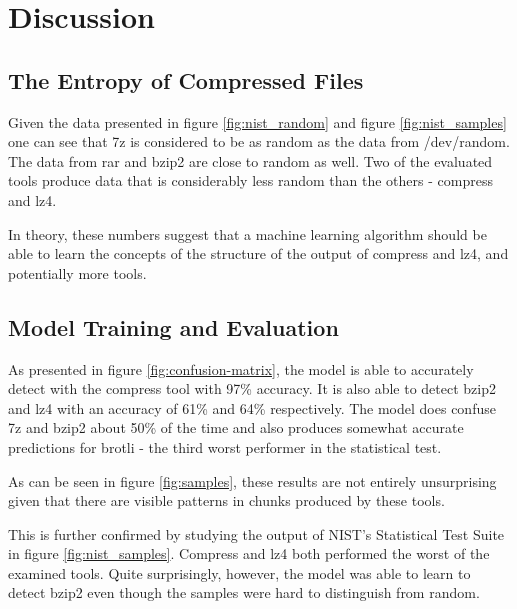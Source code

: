 \documentclass[conference]{IEEEtran}
\begin{document}
\section{Discussion}

\subsection{The Entropy of Compressed Files}

Given the data presented in figure \ref{fig:nist_random} and figure \ref{fig:nist_samples} one can see that 7z is considered to be as random as the data from /dev/random. The data from rar and bzip2 are close to random as well. Two of the evaluated tools produce data that is considerably less random than the others - compress and lz4.

In theory, these numbers suggest that a machine learning algorithm should be able to learn the concepts of the structure of the output of compress and lz4, and potentially more tools\cite{lakshmanan2021machine}.

\subsection{Model Training and Evaluation}

As presented in figure \ref{fig:confusion-matrix}, the model is able to accurately detect with the compress tool with 97\% accuracy. It is also able to detect bzip2 and lz4 with an accuracy of 61\% and 64\% respectively. The model does confuse 7z and bzip2 about 50\% of the time and also produces somewhat accurate predictions for brotli - the third worst performer in the statistical test.

As can be seen in figure \ref{fig:samples}, these results are not entirely unsurprising given that there are visible patterns in chunks produced by these tools.

This is further confirmed by studying the output of NIST's Statistical Test Suite in figure \ref{fig:nist_samples}. Compress and lz4 both performed the worst of the examined tools. Quite surprisingly, however, the model was able to learn to detect bzip2 even though the samples were hard to distinguish from random.

\end{document}
